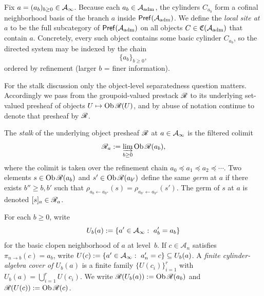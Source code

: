 Fix $a=(a_b)_{b\ge 0}\in \mathcal{A}_{\infty}$.  Because each $a_b\in \mathcal{A}_{\mathrm{adm}}$, the cylinders
$C_{a_b}$ form a cofinal neighborhood basis of the branch $a$ inside
$\mathsf{Pref}(\mathcal{A}_{\mathrm{adm}})$.  We define the \emph{local site at $a$} to be the full
subcategory of $\mathsf{Pref}(\mathcal{A}_{\mathrm{adm}})$ on all objects
$C\in\mathfrak{C}(\mathcal{A}_{\mathrm{adm}})$ that contain $a$.  Concretely, every such object
contains some basic cylinder $C_{a_b}$, so the directed system may be indexed
by the chain
\[
\{a_b\}_{b\ge 0},
\]
ordered by refinement (larger $b$ = finer information).

For the stalk discussion only the object-level separatedness question matters.
Accordingly we pass from the groupoid-valued prestack $\mathscr{R}$ to its underlying
set-valued presheaf of objects $U\mapsto \operatorname{Ob}\mathscr{R}(U)$, and by abuse of notation
continue to denote that presheaf by $\mathscr{R}$.

\begin{definition}
\label{def:stalk-germ}
The \emph{stalk} of the underlying object presheaf $\mathscr{R}$ at $a\in\mathcal{A}_{\infty}$ is the
filtered colimit
\[
\mathscr{R}_a := \varinjlim_{b\ge 0} \operatorname{Ob}\mathscr{R}(a_b),
\]
where the colimit is taken over the refinement chain
$a_0\preceq a_1\preceq a_2\preceq \cdots$.  Two elements
$s\in\operatorname{Ob}\mathscr{R}(a_b)$ and $s'\in\operatorname{Ob}\mathscr{R}(a_{b'})$ define the same \emph{germ} at $a$
if there exists $b''\ge b,b'$ such that
$\rho_{a_b\leftarrow a_{b''}}(s)=\rho_{a_{b'}\leftarrow a_{b''}}(s')$.  The
germ of $s$ at $a$ is denoted $[s]_a\in\mathscr{R}_a$.
\end{definition}

For each $b\ge 0$, write
\[
U_b(a):=\{a'\in\Ainf:\ a'_b=a_b\}
\]
for the basic clopen neighborhood of $a$ at level~$b$.  If
$c\in\mathcal{A}_n$ satisfies $\pi_{n\to b}(c)=a_b$, write
$U(c):=\{a'\in\mathcal{A}_{\infty}:\ a'_n=c\}\subseteq U_b(a)$.
A \emph{finite cylinder-algebra cover of $U_b(a)$} is a finite family
$\{U(c_i)\}_{i=1}^r$ with $U_b(a)=\bigcup_{i=1}^r U(c_i)$.
We write $\mathscr{R}(U_b(a)):=\operatorname{Ob}\mathscr{R}(a_b)$ and $\mathscr{R}(U(c)):=\operatorname{Ob}\mathscr{R}(c)$.

